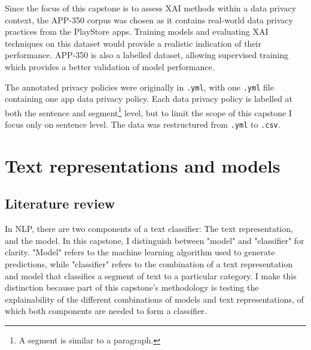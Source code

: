 Since the focus of this capstone is to assess XAI methods within a data privacy context, the APP-350 corpus was chosen as it contains real-world data privacy practices from the PlayStore apps. Training models and evaluating XAI techniques on this dataset would provide a realistic indication of their performance. APP-350 is also a labelled dataset, allowing supervised training which provides a better validation of model performance. 

The annotated privacy policies were originally in \texttt{.yml}, with one \texttt{.yml} file containing one app data privacy policy. Each data privacy policy is labelled at both the sentence and segment\footnote{A segment is similar to a paragraph.} level, but to limit the scope of this capstone I focus only on sentence level. The data was restructured from \texttt{.yml} to \texttt{.csv}.

\section{Text representations and models}
\label{sec:classifiers}
\subsection{Literature review}
In NLP, there are two components of a text classifier: The text representation, and the model. In this capstone, I distinguish between "model" and "classifier" for clarity. "Model" refers to the machine learning algorithm used to generate predictions, while "classifier" refers to the combination of a text representation and model that classifies a segment of text to a particular category. I make this distinction because part of this capstone's methodology is testing the explainability of the different combinations of models and text representations, of which both components are needed to form a classifier.

